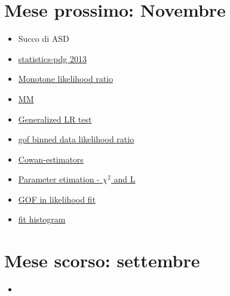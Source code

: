 \documentclass[main.tex]{subfiles}
\begin{document}
\chapter{Mese prossimo: Novembre}


\begin{itemize}
\item Succo di ASD
\item \href{http://pdg.lbl.gov/2013/reviews/rpp2013-rev-statistics.pdf}{statistics-pdg 2013}
\item \href{https://en.m.wikipedia.org/wiki/Monotone_likelihood_ratio}{Monotone likelihood ratio}
\item \href{https://pdfs.semanticscholar.org/b030/c65f8bd32e141ef1a28f7e289921786fadcf.pdf}{MM}
\item \href{https://web.stanford.edu/class/archive/stats/stats200/stats200.1172/Lecture22.pdf}{Generalized LR test}
\item \href{https://www.google.com/search?q=gof%20binned%20data%20likelihood%20ratio&ie=utf-8&oe=utf-8&client=firefox-b-m#sbfbu=1&pi=gof%20binned%20data%20likelihood%20ratio}{gof binned data likelihood ratio}
\item \href{https://agenda.infn.it/event/16360/contributions/33703/attachments/63753/76855/cowan_paestum_2019.pdf}{Cowan-estimators}
\item \href{https://www.physik.hu-berlin.de/de/gk1504/block-courses/autumn-2010/program_and_talks/Verkerke_part3}{Parameter etimation - $\chi^2$ and L}
\item \href{https://arxiv.org/pdf/physics/0509008.pdf}{GOF in likelihood fit}
\item \href{https://physique.cuso.ch/fileadmin/physique/document/jameschap7.pdf}{fit histogram}
\end{itemize}

\chapter{Mese scorso: settembre}

\begin{itemize}
\item 
\end{itemize}
\end{document}
